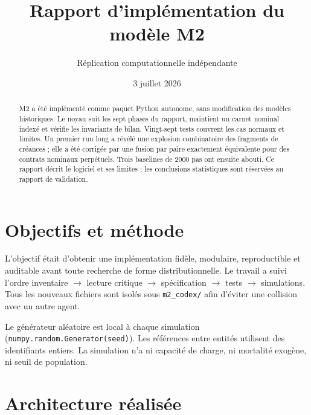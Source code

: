 \documentclass[11pt,a4paper]{article}
\title{Rapport d'implémentation du modèle M2}
\author{Réplication computationnelle indépendante}
\date{3 juillet 2026}
\begin{document}
\maketitle

\begin{abstract}
M2 a été implémenté comme paquet Python autonome, sans modification des modèles
historiques. Le noyau suit les sept phases du rapport, maintient un carnet nominal
indexé et vérifie les invariants de bilan. Vingt-sept tests couvrent les cas
normaux et limites. Un premier run long a révélé une explosion combinatoire des
fragments de créances ; elle a été corrigée par une fusion par paire exactement
équivalente pour des contrats nominaux perpétuels. Trois baselines de 2000 pas ont
ensuite abouti. Ce rapport décrit le logiciel et ses limites ; les conclusions
statistiques sont réservées au rapport de validation.
\end{abstract}

\tableofcontents

\section{Objectifs et méthode}

L'objectif était d'obtenir une implémentation fidèle, modulaire, reproductible et
auditable avant toute recherche de forme distributionnelle. Le travail a suivi
l'ordre inventaire $\rightarrow$ lecture critique $\rightarrow$ spécification
$\rightarrow$ tests $\rightarrow$ simulations. Tous les nouveaux fichiers sont
isolés sous \texttt{m2\_codex/} afin d'éviter une collision avec un autre agent.

Le générateur aléatoire est local à chaque simulation
(\texttt{numpy.random.Generator(seed)}). Les références entre entités utilisent
des identifiants entiers. La simulation n'a ni capacité de charge, ni mortalité
exogène, ni seuil de population.

\section{Architecture réalisée}
\end{document}
